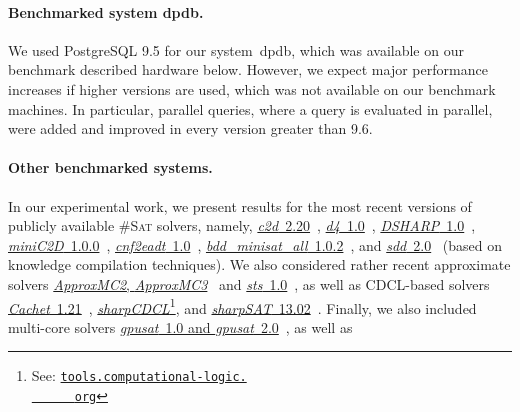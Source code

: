 \documentclass{llncs}
\newcommand{\cSAT}{\textsc{\#Sat}\xspace}%
\newcommand{\dpdb}{{\small\textsf{dpdb}}\xspace}
\begin{document}
\paragraph{Benchmarked system \dpdb.}
We used PostgreSQL 9.5 for our system~\dpdb, 
which was available on our benchmark described hardware below.
However, we expect major performance increases if higher versions are used,
which was not available on our benchmark machines.
In particular, parallel queries, where a query is evaluated in parallel,
were added and improved in every version greater than 9.6.

\paragraph{Other benchmarked systems.}
In our experimental work, we present results for the most recent
versions of publicly available \cSAT solvers, namely,
%
\href{http://reasoning.cs.ucla.edu/c2d/download.php}{\textit{c2d}~2.20}~\cite{Darwiche04a},
\href{http://www.cril.univ-artois.fr/KC/d4.html}{\textit{d4}~1.0}~\cite{LagniezMarquis17a},
\href{https://bitbucket.org/haz/dsharp}{\textit{DSHARP}~1.0}~\cite{MuiseEtAl12a},
\href{http://reasoning.cs.ucla.edu/minic2d/}{\textit{miniC2D}~1.0.0}~\cite{OztokDarwiche15a},
\href{http://www.cril.univ-artois.fr/KC/eadt.html}{\textit{cnf2eadt}~1.0}~\cite{KoricheLagniezMarquisThomas13a}, 
\href{http://www.sd.is.uec.ac.jp/toda/code/cnf2obdd.html}{\textit{bdd\_{}minisat\_\allowbreak{}all}~1.0.2}~\cite{TodaSoh15a},
and \href{http://reasoning.cs.ucla.edu/sdd/}{\textit{sdd}~2.0}~\cite{Darwiche11a} (based on %
knowledge compilation techniques).
%
%
%
%
%
%
%
We also considered rather recent approximate solvers
\href{https://bitbucket.org/kuldeepmeel/approxmc}{\textit{ApproxMC2}, \textit{ApproxMC3}}~\cite{ChakrabortyEtAl14a}
and
\href{http://cs.stanford.edu/~ermon/code/STS.zip}{\textit{sts}~1.0}~\cite{ErmonGomesSelman12a},
%
as well as %
CDCL-based solvers
%
\href{https://www.cs.rochester.edu/u/kautz/Cachet/cachet-wmc-1-21.zip}{\textit{Cachet}~1.21}~\cite{SangEtAl04},
\href{http://tools.computational-logic.org/content/sharpCDCL.php}{\textit{sharpCDCL}}\footnote{See:
  \href{http://tools.computational-logic.
    org/content/sharpCDCL.php}{\nolinkurl{tools.computational-logic.
      org}}}, %
and
\href{https://sites.google.com/site/marcthurley/sharpsat}{\textit{sharpSAT}~13.02}~\cite{Thurley06a}.
%
Finally, we also included multi-core solvers
\href{https://github.com/daajoe/GPUSAT/releases/tag/v0.815-pre}{\textit{gpusat}~1.0 and \textit{gpusat}~2.0}~\cite{FichteHecherZisser19}, as well as
\end{document}
